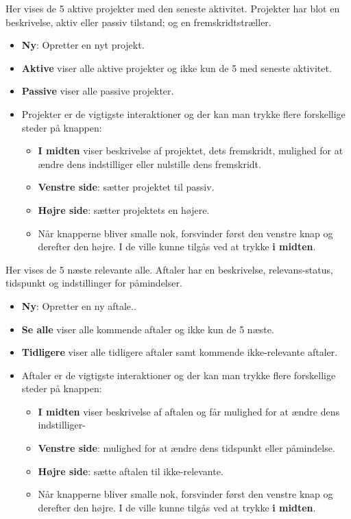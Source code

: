 \documentclass{report}
\begin{document}
Her vises de 5 aktive projekter med den seneste aktivitet. Projekter har blot en beskrivelse, aktiv eller passiv tilstand; og en fremskridtstræller.
\begin{itemize}
\item \textbf{Ny}: Opretter en nyt projekt.
\item \textbf{Aktive} viser alle aktive projekter og ikke kun de 5 med seneste aktivitet.
\item \textbf{Passive} viser alle passive projekter.
\item Projekter er de vigtigste interaktioner og der kan man trykke flere forskellige steder på knappen:
\begin{itemize}
\item \textbf{I midten} viser beskrivelse af projektet, dets fremskridt, mulighed for at ændre dens indstilliger eller nulstille dens fremskridt.
\item \textbf{Venstre side}: sætter projektet til passiv.
\item \textbf{Højre side}: sætter projektets en højere.
\item Når knapperne bliver smalle nok, forsvinder først den venstre knap og derefter den højre. I de ville kunne tilgås ved at trykke \textbf{i midten}.
\end{itemize}
\end{itemize}

Her vises de 5 næste relevante alle. Aftaler har en beskrivelse, relevans-status, tidspunkt og indstillinger for påmindelser.
\begin{itemize}
\item \textbf{Ny}: Opretter en ny aftale..
\item \textbf{Se alle} viser alle kommende aftaler og ikke kun de 5 næste.
\item \textbf{Tidligere} viser alle tidligere aftaler samt kommende ikke-relevante aftaler.
\item Aftaler er de vigtigste interaktioner og der kan man trykke flere forskellige steder på knappen:
\begin{itemize}
\item \textbf{I midten} viser beskrivelse af aftalen og får mulighed for at ændre dens indstilliger-
\item \textbf{Venstre side}: mulighed for at ændre dens tidspunkt eller påmindelse.
\item \textbf{Højre side}: sætte aftalen til ikke-relevante.
\item Når knapperne bliver smalle nok, forsvinder først den venstre knap og derefter den højre. I de ville kunne tilgås ved at trykke \textbf{i midten}.
\end{itemize}
\end{itemize}
\end{document}
